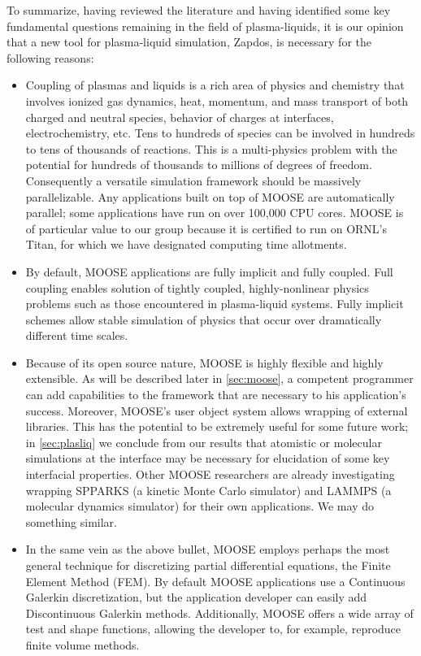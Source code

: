 To summarize, having reviewed the literature and having identified some key fundamental questions remaining in the field of plasma-liquids, it is our opinion that a new tool for plasma-liquid simulation, Zapdos, is necessary for the following reasons:

\begin{itemize}
\item \label{itm:parallel} Coupling of plasmas and liquids is a rich area of physics and chemistry that involves ionized gas dynamics, heat, momentum, and mass transport of both charged and neutral species, behavior of charges at interfaces, electrochemistry, etc. Tens to hundreds of species can be involved in hundreds to tens of thousands of reactions. This is a multi-physics problem with the potential for hundreds of thousands to millions of degrees of freedom. Consequently a versatile simulation framework should be massively parallelizable. Any applications built on top of MOOSE are automatically parallel; some applications have run on over 100,000 CPU cores. MOOSE is of particular value to our group because it is certified to run on ORNL's Titan, for which we have designated computing time allotments.
\item \label{itm:implicit} By default, MOOSE applications are fully implicit and fully coupled. Full coupling enables solution of tightly coupled, highly-nonlinear physics problems such as those encountered in plasma-liquid systems. Fully implicit schemes allow stable simulation of physics that occur over dramatically different time scales.
\item \label{itm:extensible} Because of its open source nature, MOOSE is highly flexible and highly extensible. As will be described later in \cref{sec:moose}, a competent programmer can add capabilities to the framework that are necessary to his application's success. Moreover, MOOSE's user object system allows wrapping of external libraries. This has the potential to be extremely useful for some future work; in \cref{sec:plasliq} we conclude from our results that atomistic or molecular simulations at the interface may be necessary for elucidation of some key interfacial properties. Other MOOSE researchers are already investigating wrapping SPPARKS (a kinetic Monte Carlo simulator) and LAMMPS (a molecular dynamics simulator) for their own applications. We may do something similar.
\item \label{itm:math} In the same vein as the above bullet, MOOSE employs perhaps the most general technique for discretizing partial differential equations, the Finite Element Method (FEM). By default MOOSE applications use a Continuous Galerkin discretization, but the application developer can easily add Discontinuous Galerkin methods. Additionally, MOOSE offers a wide array of test and shape functions, allowing the developer to, for example, reproduce finite volume methods.

\end{itemize}
